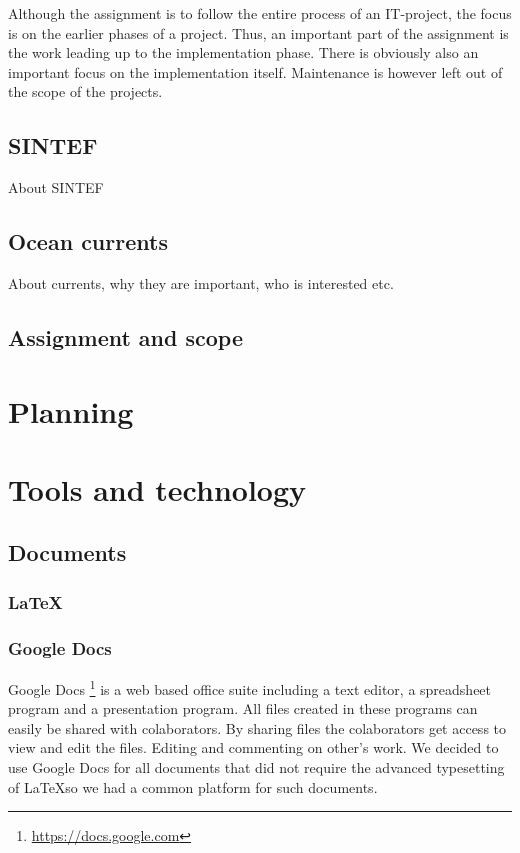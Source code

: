 \documentclass[11pt,a4paper,titlepage,oneside]{report}
\begin{document}
Although the assignment is to follow the entire process of an IT-project, the focus is on the earlier phases of a project. Thus, an important part of the assignment is the work leading up to the implementation phase. There is obviously also an important focus on the implementation itself. Maintenance is however left out of the scope of the projects.

\section{SINTEF}
About SINTEF

\section{Ocean currents}
About currents, why they are important, who is interested etc.

\section{Assignment and scope}

\chapter{Planning}

\chapter{Tools and technology}
\section{Documents}

  \subsection{\LaTeX}
  \subsection{Google Docs}
  Google Docs \footnote{\url{https://docs.google.com}} is a web based office suite including a text editor, a spreadsheet program and a presentation program. All files created in these programs can easily be shared with colaborators. By sharing files the colaborators get access to view and edit the files. Editing and commenting on other's work. We decided to use Google Docs for all documents that did not require the advanced typesetting of \LaTeX  so we had a common platform for such documents.
\end{document}
